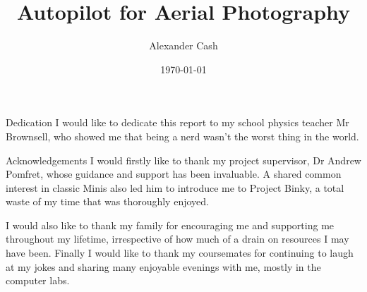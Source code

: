 \documentclass{uoyths}
\begin{document}
\begin{titlepage}[cover=true, title=true, logo=true] 
\title{Autopilot for Aerial Photography}
\author{Alexander Cash}
\date{\today}
\end{titlepage}

\begin{frontMatterEnv}

\begin{chapterEnv}{Dedication}
I would like to dedicate this report to my school physics teacher Mr Brownsell, who showed me that being a nerd wasn't the worst thing in the world.
\end{chapterEnv}

\begin{chapterEnv}{Acknowledgements}
I would firstly like to thank my project supervisor, Dr Andrew Pomfret, whose guidance and support has been invaluable. A shared common interest in classic Minis also led him to introduce me to Project Binky, a total waste of my time that was thoroughly enjoyed.

I would also like to thank my family for encouraging me and supporting me throughout my lifetime, irrespective of how much of a drain on resources I may have been. Finally I would like to thank my coursemates for continuing to laugh at my jokes and sharing many enjoyable evenings with me, mostly in the computer labs. 

\end{chapterEnv}



{\singlespacing\tableofcontents}%

\listoffigures

\listoftables

\end{frontMatterEnv}


\begin{mainMatterEnv}











\end{mainMatterEnv}

\begin{backMatterEnv}


\printglossaries











% 




\end{backMatterEnv}
\end{document}
